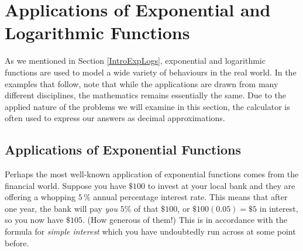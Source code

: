 \section{Applications of Exponential and Logarithmic Functions}

\label{ExpLogApplications}

As we mentioned in Section \ref{IntroExpLogs}, exponential and logarithmic functions are used to model a wide variety of behaviours in the real world.  In the examples that follow, note that while the applications are drawn from many different disciplines, the mathematics remains essentially the same.  Due to the applied nature of the problems we will examine in this section, the calculator is often used to express our answers as decimal approximations.

\subsection{Applications of Exponential Functions}
\label{expapp}

Perhaps the most well-known application of exponential functions comes from the financial world.  Suppose you have $ \$ 100$ to invest at your local bank and they are offering a whopping $5 \, \%$ annual percentage interest rate.  This means that after one year, the bank will pay \textit{you} $5 \%$ of that $\$100$, or $ \$ 100(0.05) =\$ 5$ in interest, so you now have $\$105$. (How generous of them!)    This is in accordance with the formula for  \textit{simple interest} which you have undoubtedly run across at some point before.

\smallskip


\smallskip

